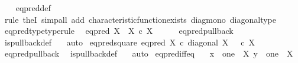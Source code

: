 \begin{isabellebody}
%
\isadelimproof
\ \ %
\endisadelimproof
%
\isatagproof
{}\isamarkupfalse%
\ eq{\isacharunderscore}{\kern0pt}pred{\isacharunderscore}{\kern0pt}def\isanewline
\ \ \isamarkupfalse%
\ {\isacharparenleft}{\kern0pt}rule\ the{}I{}{\isacharcomma}{\kern0pt}\ simp{\isacharunderscore}{\kern0pt}all\ add{\isacharcolon}{\kern0pt}\ characteristic{\isacharunderscore}{\kern0pt}function{\isacharunderscore}{\kern0pt}exists\ diag{\isacharunderscore}{\kern0pt}mono\ diagonal{\isacharunderscore}{\kern0pt}type{\isacharparenright}{\kern0pt}%
\endisatagproof
{\isafoldproof}%
%
\isadelimproof
\isanewline
%
\endisadelimproof
\isanewline
{}\isamarkupfalse%
\ eq{\isacharunderscore}{\kern0pt}pred{\isacharunderscore}{\kern0pt}type{\isacharbrackleft}{\kern0pt}type{\isacharunderscore}{\kern0pt}rule{\isacharbrackright}{\kern0pt}{\isacharcolon}{\kern0pt}\isanewline
\ \ {\isachardoublequoteopen}eq{\isacharunderscore}{\kern0pt}pred\ X\ {\isacharcolon}{\kern0pt}\ X\ {\isasymtimes}\isactrlsub c\ X\ {\isasymrightarrow}\ {\isasymOmega}{\isachardoublequoteclose}\isanewline
%
\isadelimproof
\ \ %
\endisadelimproof
%
\isatagproof
{}\isamarkupfalse%
\ eq{\isacharunderscore}{\kern0pt}pred{\isacharunderscore}{\kern0pt}pullback\ \isamarkupfalse%
\ is{\isacharunderscore}{\kern0pt}pullback{\isacharunderscore}{\kern0pt}def\ \ \isamarkupfalse%
\ auto%
\endisatagproof
{\isafoldproof}%
%
\isadelimproof
\isanewline
%
\endisadelimproof
\isanewline
{}\isamarkupfalse%
\ eq{\isacharunderscore}{\kern0pt}pred{\isacharunderscore}{\kern0pt}square{\isacharcolon}{\kern0pt}\ {\isachardoublequoteopen}eq{\isacharunderscore}{\kern0pt}pred\ X\ {\isasymcirc}\isactrlsub c\ diagonal\ X\ {\isacharequal}{\kern0pt}\ {\isasymt}\ {\isasymcirc}\isactrlsub c\ {\isasymbeta}\isactrlbsub X\isactrlesub {\isachardoublequoteclose}\isanewline
%
\isadelimproof
\ \ %
\endisadelimproof
%
\isatagproof
{}\isamarkupfalse%
\ eq{\isacharunderscore}{\kern0pt}pred{\isacharunderscore}{\kern0pt}pullback\ \isamarkupfalse%
\ is{\isacharunderscore}{\kern0pt}pullback{\isacharunderscore}{\kern0pt}def\ \ \isamarkupfalse%
\ auto%
\endisatagproof
{\isafoldproof}%
%
\isadelimproof
\isanewline
%
\endisadelimproof
\isanewline
{}\isamarkupfalse%
\ eq{\isacharunderscore}{\kern0pt}pred{\isacharunderscore}{\kern0pt}iff{\isacharunderscore}{\kern0pt}eq{\isacharcolon}{\kern0pt}\isanewline
\ \ \ {\isachardoublequoteopen}x\ {\isacharcolon}{\kern0pt}\ one\ {\isasymrightarrow}\ X{\isachardoublequoteclose}\ {\isachardoublequoteopen}y\ {\isacharcolon}{\kern0pt}\ one\ {\isasymrightarrow}\ X{\isachardoublequoteclose}\isanewline

\end{isabellebody}
